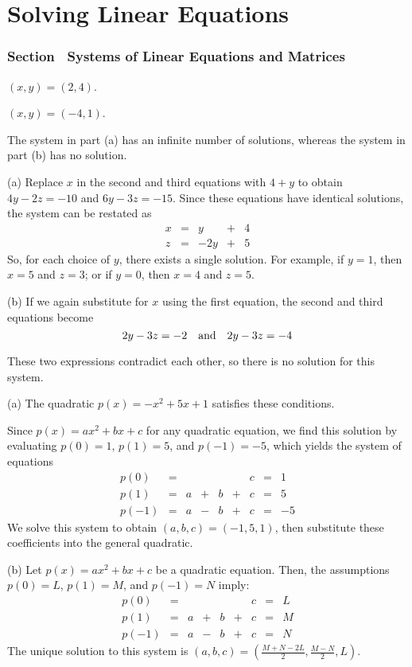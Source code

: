 \chapter{Solving Linear Equations}

\subsection*{Section~\protect{\ref{S:2.1}} Systems of Linear Equations and
Matrices}

 $(x,y) = (2,4)$.

 $(x,y) = (-4,1)$.

\ans The system in part (a) has an infinite number of solutions, whereas
the system in part (b) has no solution.

\soln (a) Replace $x$ in the second and third equations with
$4 + y$ to obtain $4y - 2z = -10$ and $6y - 3z = -15$.  Since these
equations have identical solutions, the system can be restated as
\[
\begin{array}{rrrrrrr}
x & = & y & + & 4 \\ 
z & = & -2y & + & 5\end{array}
\]
So, for each choice of $y$, there exists a single solution.  For
example, if $y = 1$, then $x = 5$ and $z = 3$; or if $y = 0$, then
$x = 4$ and $z = 5$.

(b) If we again substitute for $x$ using the first equation, the
second and third equations become
\[
2y - 3z = -2 \quad\mbox{and}\quad 2y - 3z = -4
\]

These two expressions contradict each other, so there is no solution
for this system.

(a) \ans The quadratic $p(x) = -x^2 + 5x + 1$ satisfies these conditions.

\soln Since $p(x) = ax^2 + bx + c$ for any quadratic equation, we find
this solution by evaluating $p(0) = 1$, $p(1) = 5$, and $p(-1) = -5$,
which yields the system of equations
\[
\begin{array}{lrrrrrrrr}
p(0) & = & & & & & c & = & 1 \\
p(1) & = & a & + & b & + & c & = & 5 \\
p(-1) & = & a & - & b & + & c & = & -5\end{array}
\]
We solve this system to obtain $(a,b,c) = (-1,5,1)$, then substitute
these coefficients into the general quadratic.

(b) Let $p(x) = ax^2 + bx + c$ be a quadratic equation.  Then, the
assumptions $p(0) = L$, $p(1) = M$, and $p(-1) = N$ imply:
\[
\begin{array}{lrrrrrrrr}
p(0) & = & & & & & c & = & L \\
p(1) & = & a & + & b & + & c & = & M \\
p(-1) & = & a & - & b & + & c & = & N\end{array}
\]
The unique solution to this system is $(a,b,c) =
(\frac{M + N - 2L}{2},\frac{M - N}{2},L)$.

